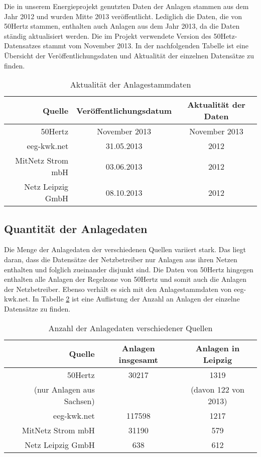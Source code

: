 \documentclass[a4paper,11pt]{article}
\begin{document}
Die in unserem Energieprojekt genutzten Daten der Anlagen stammen aus dem Jahr
2012 und wurden Mitte 2013 veröffentlicht. Lediglich die Daten, die von
50Hertz stammen, enthalten auch Anlagen aus dem Jahr 2013, da die Daten
ständig aktualisiert werden. Die im Projekt verwendete Version des
50Hetz-Datensatzes stammt vom November 2013. In der nachfolgenden Tabelle ist
eine Übersicht der Veröffentlichungsdaten und Aktualität der einzelnen
Datensätze zu finden.

\begin{table}[ht]
\centering
\begin{tabular}[h]{r|c|c}
Quelle & Veröffentlichungsdatum & Aktualität der Daten  \\\hline
50Hertz & November 2013  & November 2013  \\\hline
eeg-kwk.net & 31.05.2013 & 2012  \\\hline
MitNetz Strom mbH & 03.06.2013 & 2012 \\\hline
Netz Leipzig GmbH & 08.10.2013 & 2012
\end{tabular}
\caption{Aktualität der Anlagestammdaten}
\label{tab:anlageaktualitaet}
\end{table}

\subsection{Quantität der Anlagedaten}
Die Menge der Anlagedaten der verschiedenen Quellen variiert stark. Das liegt
daran, dass die Datensätze der Netzbetreiber nur Anlagen aus ihren Netzen
enthalten und folglich zueinander disjunkt sind. Die Daten von 50Hertz
hingegen enthalten alle Anlagen der Regelzone von 50Hertz und somit auch die
Anlagen der Netzbetreiber. Ebenso verhält es sich mit den Anlagestammdaten von
eeg-kwk.net. In Tabelle \ref{tab:anlagequantitaet} ist eine Auflistung der
Anzahl an Anlagen der einzelne Datensätze zu finden.

\begin{table}[ht]
\centering
\begin{tabular}[h]{r|c|c}
Quelle & Anlagen insgesamt & Anlagen in Leipzig \\\hline
50Hertz & 30217 & 1319 \\
(nur Anlagen aus Sachsen) & & (davon 122 von 2013) \\\hline
eeg-kwk.net & 117598 & 1217  \\\hline
MitNetz Strom mbH & 31190 & 579 \\\hline
Netz Leipzig GmbH & 638 & 612 
\end{tabular}
\caption{Anzahl der Anlagedaten verschiedener Quellen}
\label{tab:anlagequantitaet}
\end{table}
\end{document}
